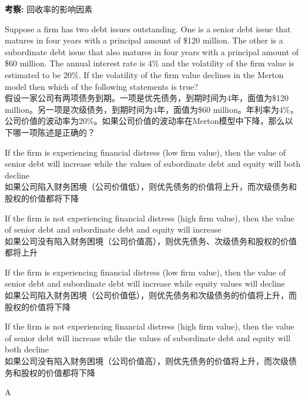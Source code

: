 \documentclass{article}
\newcounter{question} %
\newcommand{\checklist}[1]{
    \textbf{考察:} #1 \par %
    \addcontentsline{toc}{subsection}{题号\thequestion 考察: #1} %
    \vspace{2em} %
}
\begin{document}
\checklist{回收率的影响因素}

\begin{question}
    Suppose a firm has two debt issues outstanding. One is a senior debt issue that matures in four years with a principal amount of \$120 million. The other is a subordinate debt issue that also matures in four years with a principal amount of \$60 million. The annual interest rate is 4\% and the volatility of the firm value is estimated to be 20\%. If the volatility of the firm value declines in the Merton model then which of the following statements is true?
    \\ 假设一家公司有两项债务到期。一项是优先债务，到期时间为4年，面值为\$120 million。另一项是次级债务，到期时间为4年，面值为\$60 million。年利率为4\%，公司价值的波动率为20\%。如果公司价值的波动率在Merton模型中下降，那么以下哪一项陈述是正确的？
\end{question}

\begin{choices}
    \item If the firm is experiencing financial distress (low firm value), then the value of senior debt will increase while the values of subordinate debt and equity will both decline\\
    如果公司陷入财务困境（公司价值低），则优先债务的价值将上升，而次级债务和股权的价值都将下降
    \item If the firm is not experiencing financial distress (high firm value), then the value of senior debt and subordinate debt and equity will increase\\
    如果公司没有陷入财务困境（公司价值高），则优先债务、次级债务和股权的价值都将上升
    \item If the firm is experiencing financial distress (low firm value), then the value of senior debt and subordinate debt will increase while equity values will decline\\
    如果公司陷入财务困境（公司价值低），则优先债务和次级债务的价值将上升，而股权的价值将下降
    \item If the firm is not experiencing financial distress (high firm value), then the value of senior debt will increase while the values of subordinate debt and equity will both decline\\
    如果公司没有陷入财务困境（公司价值高），则优先债务的价值将上升，而次级债务和股权的价值都将下降
\end{choices}

\begin{correctanswer}
    A
\end{correctanswer}
\end{document}
